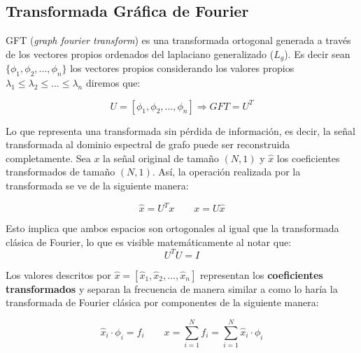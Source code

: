 \subsection{Transformada Gráfica de Fourier}\label{subsec: gft}

    GFT (\textit{graph fourier transform}) es una transformada ortogonal generada a través de los vectores propios ordenados del laplaciano generalizado ($L_g$). Es decir sean $\{ \phi_1, \phi_2, ..., \phi_n \}$ los vectores propios considerando los valores propios $\lambda_1 \leq \lambda_2 \leq ... \leq \lambda_n$ diremos que:

        \begin{equation*}
            U = [\phi_1, \phi_2, ..., \phi_n] \Longrightarrow GFT = U^T
        \end{equation*}

    Lo que representa una transformada sin pérdida de información, es decir, la señal transformada al dominio espectral de grafo puede ser reconstruida completamente. Sea $x$ la señal original de tamaño $(N,1)$ y $\hat{x}$ los coeficientes transformados de tamaño $(N,1)$. Así, la operación realizada por la transformada se ve de la siguiente manera:

        \begin{equation*}
            \hat{x} = U^Tx \quad \quad x = U\hat{x}
        \end{equation*}

    \vspace{0.4cm} 
    
    Esto implica que ambos espacios son ortogonales al igual que la transformada clásica de Fourier, lo que es visible matemáticamente al notar que:
        \begin{equation*}
            U^T U = I
        \end{equation*} 

    \vspace{0.4cm}
    
    Los valores descritos por $\hat{x} = [\hat{x}_1,\hat{x}_2, ..., \hat{x}_n]$ representan los \textbf{coeficientes transformados} y separan la frecuencia de manera similar a como lo haría la transformada de Fourier clásica por componentes de la siguiente manera:

    \begin{equation*}
        \hat{x}_i \cdot \phi_i = f_i \quad \quad x = \sum_{i=1}^N f_i = \sum_{i=1}^N \hat{x}_i \cdot \phi_i 
    \end{equation*}

